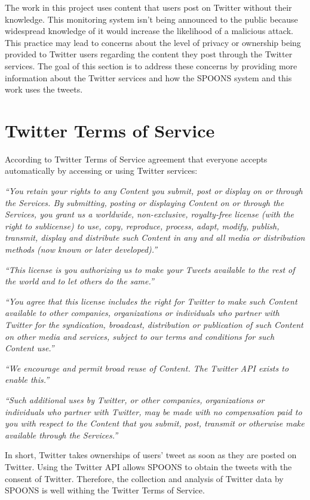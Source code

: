 \documentclass[12pt]{ucthesis}
\begin{document}
The work in this project uses content that users post on Twitter without their
knowledge. This monitoring system isn't being announced to the
public because widespread knowledge of it would increase the likelihood of a
malicious attack. This practice may lead to concerns about the level of privacy
or ownership being provided to Twitter users regarding the content they post
through the Twitter services. The goal of this section is to address these
concerns by providing more information about the Twitter services and how the
SPOONS system and this work uses the tweets.

\section{Twitter Terms of Service}

According to Twitter Terms of Service\cite{termsOfService} agreement that
everyone accepts automatically by accessing or using Twitter services:

\emph{``You retain your rights to any Content you submit, post or
display on or through the Services. By submitting, posting or displaying Content
on or through the Services, you grant us a worldwide, non-exclusive,
royalty-free license (with the right to sublicense) to use, copy, reproduce,
process, adapt, modify, publish, transmit, display and distribute such Content
in any and all media or distribution methods (now known or later developed).''}

\emph{``This license is you authorizing us to make your Tweets available to the
rest of the world and to let others do the same.''}

\emph{``You agree that this license includes the right for Twitter to make such
Content available to other companies, organizations or individuals who partner with
Twitter for the syndication, broadcast, distribution or publication of such
Content on other media and services, subject to our terms and conditions for
such Content use.''}

\emph{``We encourage and permit broad reuse of Content. The Twitter API exists to
enable this.''}

\emph{``Such additional uses by Twitter, or other companies, organizations or
individuals who partner with Twitter, may be made with no compensation paid to
you with respect to the Content that you submit, post, transmit or otherwise
make available through the Services.''}

In short, Twitter takes ownerships of users' tweet as soon as they are posted on Twitter.
Using the Twitter API allows SPOONS to obtain the tweets with the consent of Twitter.
Therefore, the collection and analysis of Twitter data by SPOONS is well withing the
Twitter Terms of Service.
\end{document}
